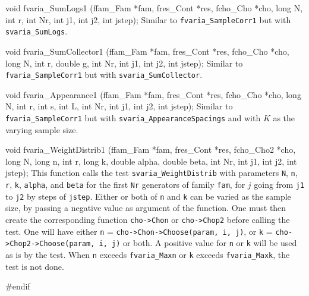 void fvaria_SumLogs1 (ffam_Fam *fam, fres_Cont *res, fcho_Cho *cho,
                      long N, int r,
                      int Nr, int j1, int j2, int jstep);
\endcode
\tab  Similar to {\tt fvaria\_SampleCorr1} but with {\tt svaria\_SumLogs}.
\endtab
\code


void fvaria_SumCollector1 (ffam_Fam *fam, fres_Cont *res, fcho_Cho *cho,
                           long N, int r, double g,
                           int Nr, int j1, int j2, int jstep);
\endcode
\tab Similar to {\tt fvaria\_SampleCorr1} but with {\tt svaria\_SumCollector}.
\endtab
\code


void fvaria_Appearance1 (ffam_Fam *fam, fres_Cont *res, fcho_Cho *cho,
                         long N, int r, int s, int L,
                         int Nr, int j1, int j2, int jstep); 
\endcode
\tab Similar to {\tt fvaria\_SampleCorr1} but with
  {\tt svaria\_AppearanceSpacings} and with $K$ as the varying sample size.
\endtab
\code


void fvaria_WeightDistrib1 (ffam_Fam *fam, fres_Cont *res, fcho_Cho2 *cho,
                            long N, long n, int r, long k,
                            double alpha, double beta,
                            int Nr, int j1, int j2, int jstep);
\endcode
\tab This function calls the test {\tt svaria\_WeightDistrib} with
  parameters {\tt N}, {\tt n},  {\tt r},  {\tt k}, {\tt alpha},
  and {\tt beta} for the
  first {\tt Nr} generators of family {\tt fam}, for $j$ going from
  {\tt j1} to {\tt j2} by steps of {\tt jstep}. Either or both of  {\tt n}
  and {\tt k} can be varied as the sample size, by passing a negative value as
  argument of the function. One must then create the corresponding function
  {\tt cho->Chon} or {\tt cho->Chop2} before calling the test.
  One will have either {\tt n} = {\tt cho->Chon->Choose(param, i, j)},
  or {\tt k} = {\tt cho->Chop2->Choose(param, i, j)} or both. A positive
  value for {\tt n} or {\tt k} will be used as is by the test. When {\tt n}
  exceeds {\tt fvaria\_Maxn} or {\tt k} exceeds {\tt fvaria\_Maxk}, 
  the test is not done.
\endtab

\code
\hide 
#endif
\endhide
\endcode
